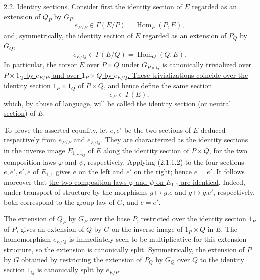 
2.2. \underline{Identity sections}. Consider first the identity section
of $E$ regarded as an extension of $Q_P$ by $G_P$,
\begin{equation}\tag{2.2.1}
 e_{E/P}\in\Gamma(E/P)=\operatorname{Hom}_P(P,E),
\end{equation}
and, symmetrically, the identity section of $E$ regarded as an extension
of $P_Q$ by $G_Q$,
\begin{equation}\tag{2.2.2}
 e_{E/Q}\in\Gamma(E/Q)=\operatorname{Hom}_Q(Q,E).
\end{equation}
In particular, \underline{the torsor $E$ over $P\times Q$ under
$G_{P\times Q}$ is canonically trivialized over $P\times1_Q$ by
$e_{E/P}$, and over $1_P\times Q$ by $e_{E/Q}$. These trivializations
coincide over the identity section $1_P\times1_Q$ of $P\times Q$}, and
hence define the same section
\begin{equation}\tag{2.2.3}
 e_E\in\Gamma(E),
\end{equation}
which, by abuse of language, will be called the \underline{identity
section} (or \underline{neutral section}) of $E$.


To prove the asserted equality, let $e,e'$ be the two sections of $E$
deduced respectively from $e_{E/P}$ and $e_{E/Q}$. They are
characterized as the identity sections in the inverse image
$E_{1_P,1_Q}$ of $E$ along the identity section of $P\times Q$, for the
two composition laws $\varphi$ and $\psi$, respectively. Applying
(2.1.1.2) to the four sections $e,e',e',e$ of $E_{1,1}$ gives $e$ on
the left and $e'$ on the right; hence $e=e'$. It follows moreover that
\underline{the two composition laws $\varphi$ and $\psi$ on $E_{1,1}$
are identical}. Indeed, under transport of structure by the morphisms
$g\mapsto g.e$ and $g\mapsto g.e'$, respectively, both correspond to
the group law of $G$, and $e=e'$.

The extension of $Q_P$ by $G_P$ over the base $P$, restricted over the
identity section $1_P$ of $P$, gives an extension of $Q$ by $G$ on the
inverse image of $1_P\times Q$ in $E$. The homomorphism $e_{E/Q}$ is
immediately seen to be multiplicative for this extension structure, so
the extension is canonically split. Symmetrically, the extension of $P$
by $G$ obtained by restricting the extension of $P_Q$ by $G_Q$ over
$Q$ to the identity section $1_Q$ is canonically split by $e_{E/P}$.

